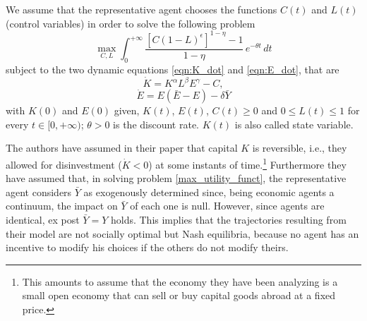 We assume that the representative agent chooses the functions $C(t)$ and $L(t)$ (control variables) in order to solve the following problem
\begin{equation} \label{max_utility_funct}
	\max_{C,L} \int_{0}^{+\infty} \frac{[C(1-L)^{\epsilon}]^{1-\eta} -1}{1-\eta}\, e^{-\theta t} \,dt 
\end{equation}
subject to the two dynamic equations \eqref{eqn:K_dot} and \eqref{eqn:E_dot}, that are
$$\dot{K} = K^\alpha L^\beta E^\gamma -C,$$
$$\dot{E} = E(\bar{E}-E)-\delta\bar{Y}$$ 
with $K(0)$ and $E(0)$ given, $K(t)$, $E(t)$, $C(t)\geq0$ and $0\leq L(t)\leq 1$ for every $t\in [0,+\infty)$; $\theta>0$ is the discount rate. $K(t)$ is also called state variable.

The authors have assumed in their paper that capital $K$ is reversible, i.e., they allowed for disinvestment ($\dot{K}<0$) at some instants of time.\footnote{This amounts to assume that the economy they have been analyzing is a small open economy that can sell or buy capital goods abroad at a fixed price.} Furthermore they have assumed that, in solving problem \eqref{max_utility_funct}, the representative agent considers $\bar{Y}$ as exogenously determined since, being economic agents a continuum, the impact on $\bar{Y}$ of each one is null. However, since agents are identical, ex post $\bar{Y} = Y$ holds. This implies that the trajectories resulting from their model are not socially optimal but Nash equilibria, because no agent has an incentive to modify his choices if the others do not modify theirs.

